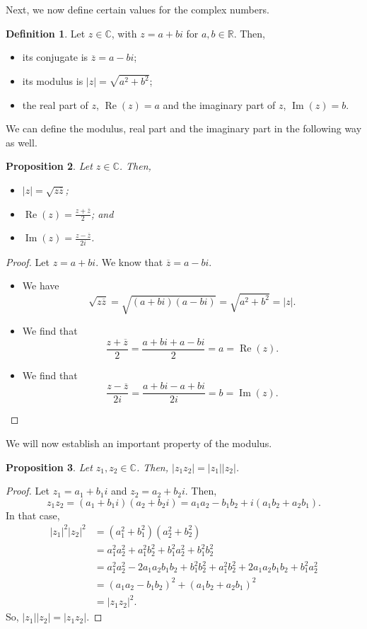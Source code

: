 \documentclass[a4paper, openany]{memoir}
\theoremstyle{definition}
\newtheorem{definition}{Definition}[section]
\theoremstyle{plain}
\newtheorem{proposition}[definition]{Proposition}
\begin{document}
Next, we now define certain values for the complex numbers.
\begin{definition}
Let $z \in \mathbb{C}$, with $z = a + bi$ for $a, b \in \mathbb{R}$. Then,
\begin{itemize}
    \item its conjugate is $\overline{z} = a - bi$;
    \item its modulus is $|z| = \sqrt{a^2 + b^2}$;
    \item the real part of $z$, $\operatorname{Re}(z) = a$ and the imaginary part of $z$, $\operatorname{Im}(z) = b$.
\end{itemize}
\end{definition}
\noindent We can define the modulus, real part and the imaginary part in the following way as well.
\begin{proposition}
Let $z \in \mathbb{C}$. Then,
\begin{itemize}
    \item $|z| = \sqrt{z \overline{z}}$;
    \item $\operatorname{Re}(z) = \frac{z + \overline{z}}{2}$; and
    \item $\operatorname{Im}(z) = \frac{z - \overline{z}}{2i}$.
\end{itemize}
\end{proposition}
\begin{proof}
Let $z = a + bi$. We know that $\overline{z} = a - bi$. 
\begin{itemize}
    \item We have
    \[\sqrt{z \overline{z}} = \sqrt{(a + bi)(a - bi)} = \sqrt{a^2 + b^2} = |z|.\]
    \item We find that
    \[\frac{z + \overline{z}}{2} = \frac{a + bi + a - bi}{2} = a = \operatorname{Re}(z).\]
    \item We find that
    \[\frac{z - \overline{z}}{2i} = \frac{a + bi - a + bi}{2i} = b = \operatorname{Im}(z).\]
\end{itemize}
\end{proof}
\noindent We will now establish an important property of the modulus.
\begin{proposition}
Let $z_1, z_2 \in \mathbb{C}$. Then, $|z_1z_2| = |z_1||z_2|$.
\end{proposition}
\begin{proof}
Let $z_1 = a_1 + b_1i$ and $z_2 = a_2 + b_2i$. Then,
\[z_1 z_2 = (a_1 + b_1i)(a_2 + b_2i) = a_1a_2 - b_1b_2 + i(a_1b_2 + a_2b_1).\]
In that case,
\begin{align*}
    |z_1|^2|z_2|^2 &= (a_1^2 + b_1^2)(a_2^2 + b_2^2) \\
    &= a_1^2a_2^2 + a_1^2b_2^2 + b_1^2a_2^2 + b_1^2b_2^2 \\
    &= a_1^2a_2^2 - 2a_1a_2b_1b_2 + b_1^2b_2^2 + a_1^2b_2^2 + 2a_1a_2b_1b_2 + b_1^2a_2^2 \\
    &= (a_1a_2 - b_1b_2)^2 + (a_1b_2 + a_2b_1)^2 \\
    &= |z_1z_2|^2.
\end{align*}
So, $|z_1||z_2| = |z_1z_2|$.
\end{proof}
\end{document}
